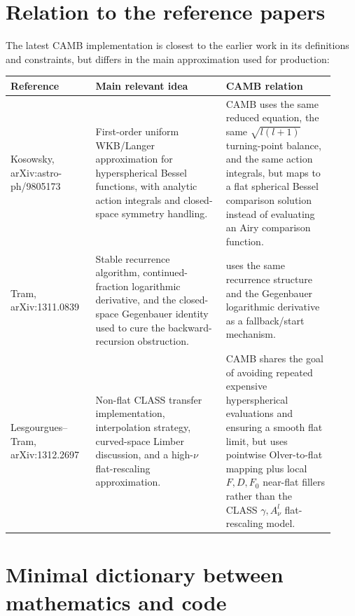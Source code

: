 \documentclass[11pt,a4paper]{article}
\newcommand{\code}[1]{\texttt{\detokenize{#1}}}
\begin{document}
\section{Relation to the reference papers}

The latest CAMB implementation is closest to the earlier work in its definitions and constraints, but differs in the main approximation used for production:
\begin{center}
\small
\begin{tabular}{p{0.24\linewidth}p{0.37\linewidth}p{0.31\linewidth}}
\toprule
Reference & Main relevant idea & CAMB relation \\
\midrule
Kosowsky, arXiv:astro-ph/9805173 \cite{kosowsky1998}
& First-order uniform WKB/Langer approximation for hyperspherical Bessel functions, with analytic action integrals and closed-space symmetry handling.
& CAMB uses the same reduced equation, the same \(\sqrt{l(l+1)}\) turning-point balance, and the same action integrals, but maps to a flat spherical Bessel comparison solution instead of evaluating an Airy comparison function. \\
Tram, arXiv:1311.0839 \cite{tram2013}
& Stable recurrence algorithm, continued-fraction logarithmic derivative, and the closed-space Gegenbauer identity used to cure the backward-recursion obstruction.
& \code{phi_recurs} uses the same recurrence structure and the Gegenbauer logarithmic derivative as a fallback/start mechanism. \\
Lesgourgues--Tram, arXiv:1312.2697 \cite{lesgourgues-tram2013}
& Non-flat \textsc{CLASS} transfer implementation, interpolation strategy, curved-space Limber discussion, and a high-\(\nu\) flat-rescaling approximation.
& CAMB shares the goal of avoiding repeated expensive hyperspherical evaluations and ensuring a smooth flat limit, but uses pointwise Olver-to-flat mapping plus local \(F,D,F_0\) near-flat fillers rather than the \textsc{CLASS} \(\gamma,A_\nu^l\) flat-rescaling model. \\
\bottomrule
\end{tabular}
\end{center}

\section{Minimal dictionary between mathematics and code}
\end{document}
